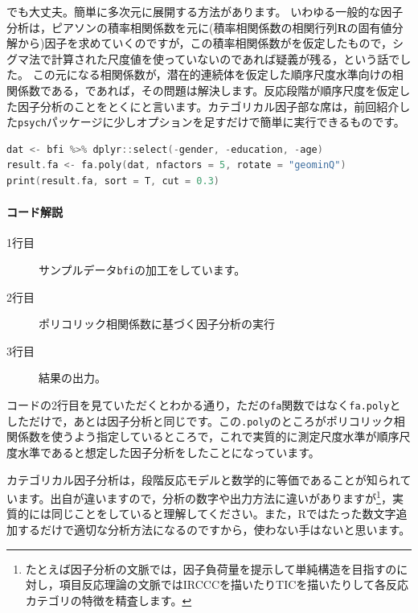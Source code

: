 \documentclass{ltjsbook}
\begin{document}
でも大丈夫。簡単に多次元に展開する方法があります。
いわゆる一般的な因子分析は，ピアソンの積率相関係数を元に(積率相関係数の相関行列$\bm{R}$の固有値分解から)因子を求めていくのですが，この積率相関係数がを仮定したもので，シグマ法で計算された尺度値を使っていないのであれば疑義が残る，という話でした。
この元になる相関係数が，潜在的連続体を仮定した順序尺度水準向けの相関係数である，であれば，その問題は解決します。反応段階が順序尺度を仮定した因子分析のことをとくにと言います。カテゴリカル因子部な席は，前回紹介した\texttt{psych}パッケージに少しオプションを足すだけで簡単に実行できるものです。

\begin{lstlisting}[language=c++,label={code:11_06},caption={GRMの実行}]
dat <- bfi %>% dplyr::select(-gender, -education, -age)
result.fa <- fa.poly(dat, nfactors = 5, rotate = "geominQ")
print(result.fa, sort = T, cut = 0.3)
\end{lstlisting}

\paragraph{コード解説}
\begin{description}
	\item[1行目] サンプルデータ\texttt{bfi}の加工をしています。
	\item[2行目] ポリコリック相関係数に基づく因子分析の実行
	\item[3行目] 結果の出力。
\end{description}

コードの2行目を見ていただくとわかる通り，ただの\texttt{fa}関数ではなく\texttt{fa.poly}としただけで，あとは因子分析と同じです。この\texttt{.poly}のところがポリコリック相関係数を使うよう指定しているところで，これで実質的に測定尺度水準が順序尺度水準であると想定した因子分析をしたことになっています。

カテゴリカル因子分析は，段階反応モデルと数学的に等価であることが知られています。出自が違いますので，分析の数字や出力方法に違いがありますが\footnote{たとえば因子分析の文脈では，因子負荷量を提示して単純構造を目指すのに対し，項目反応理論の文脈ではIRCCCを描いたりTICを描いたりして各反応カテゴリの特徴を精査します。}，実質的には同じことをしていると理解してください。また，Rではたった数文字追加するだけで適切な分析方法になるのですから，使わない手はないと思います。
\end{document}
